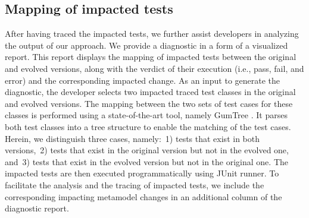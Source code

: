 

\subsection{Mapping of impacted tests}

After having traced the impacted tests, we further assist developers in analyzing the output of our approach. We provide a diagnostic in a form of a visualized report. This report displays the mapping of impacted tests between the original and evolved versions, along with the verdict of their execution (i.e., pass, fail, and error) and the corresponding impacted change. As an input to generate the diagnostic, the developer selects two impacted traced test classes in the original and evolved versions.
The mapping between the two sets of test cases for these classes is performed using a state-of-the-art tool, namely GumTree \cite{falleri2014fine}. It parses both test classes into a tree structure to enable the matching of the test cases. Herein, we distinguish three cases, namely:~1) tests that exist in both versions,~2) tests that exist in the original version but not in the evolved one, and~3) tests that exist in the evolved version but not in the original one.
The impacted tests are then executed programmatically using JUnit runner. To facilitate the analysis and the tracing of impacted tests, we include the corresponding impacting metamodel changes in an additional column of the diagnostic report.  

